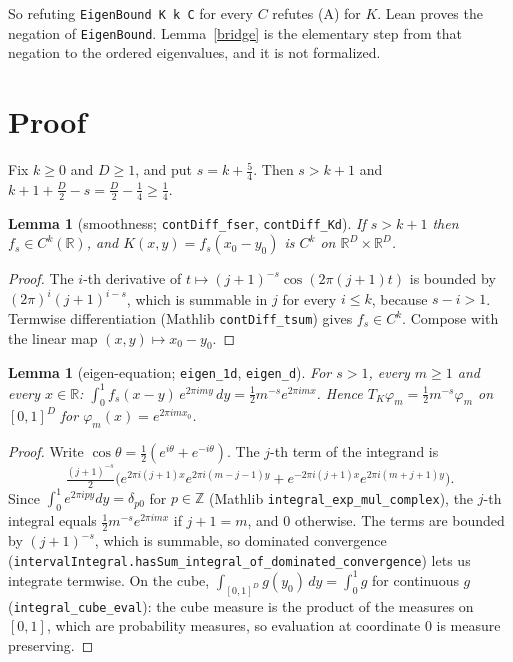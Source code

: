 \documentclass[11pt]{article}
\newtheorem{lemma}[theorem]{Lemma}
\theoremstyle{definition}
\theoremstyle{remark}
\begin{document}
So refuting \texttt{EigenBound K k C} for every $C$ refutes (A) for $K$. Lean proves the negation of
\texttt{EigenBound}. Lemma~\ref{bridge} is the elementary step from that negation to the ordered
eigenvalues, and it is not formalized.

\section{Proof}

Fix $k\ge0$ and $D\ge1$, and put $s=k+\tfrac54$. Then $s>k+1$ and $k+1+\tfrac D2-s=\tfrac D2-\tfrac14\ge\tfrac14$.

\begin{lemma}[smoothness; \texttt{contDiff\_fser}, \texttt{contDiff\_Kd}]
If $s>k+1$ then $f_s\in C^k(\mathbb R)$, and $K(x,y)=f_s(x_0-y_0)$ is $C^k$ on
$\mathbb R^D\times\mathbb R^D$.
\end{lemma}
\begin{proof}
The $i$-th derivative of $t\mapsto (j+1)^{-s}\cos(2\pi(j+1)t)$ is bounded by
$(2\pi)^i(j+1)^{i-s}$, which is summable in $j$ for every $i\le k$, because $s-i>1$. Termwise
differentiation (Mathlib \texttt{contDiff\_tsum}) gives $f_s\in C^k$. Compose with the linear map
$(x,y)\mapsto x_0-y_0$.
\end{proof}

\begin{lemma}[eigen-equation; \texttt{eigen\_1d}, \texttt{eigen\_d}]
For $s>1$, every $m\ge1$ and every $x\in\mathbb R$:
$\int_0^1 f_s(x-y)\,e^{2\pi imy}\,dy=\tfrac12 m^{-s}e^{2\pi imx}$. Hence
$T_K\varphi_m=\tfrac12m^{-s}\varphi_m$ on $[0,1]^D$ for $\varphi_m(x)=e^{2\pi imx_0}$.
\end{lemma}
\begin{proof}
Write $\cos\theta=\tfrac12(e^{i\theta}+e^{-i\theta})$. The $j$-th term of the integrand is
\[
  \tfrac{(j+1)^{-s}}2\Big(e^{2\pi i(j+1)x}e^{2\pi i(m-j-1)y}+e^{-2\pi i(j+1)x}e^{2\pi i(m+j+1)y}\Big).
\]
Since $\int_0^1e^{2\pi ipy}dy=\delta_{p0}$ for $p\in\mathbb Z$ (Mathlib
\texttt{integral\_exp\_mul\_complex}), the $j$-th integral equals $\tfrac12m^{-s}e^{2\pi imx}$ if
$j+1=m$, and $0$ otherwise. The terms are bounded by $(j+1)^{-s}$, which is summable, so dominated
convergence (\texttt{intervalIntegral.hasSum\_integral\_of\_dominated\_convergence}) lets us
integrate termwise. On the cube, $\int_{[0,1]^D}g(y_0)\,dy=\int_0^1g$ for continuous $g$
(\texttt{integral\_cube\_eval}): the cube measure is the product of the measures on $[0,1]$, which
are probability measures, so evaluation at coordinate $0$ is measure preserving.
\end{proof}
\end{document}
